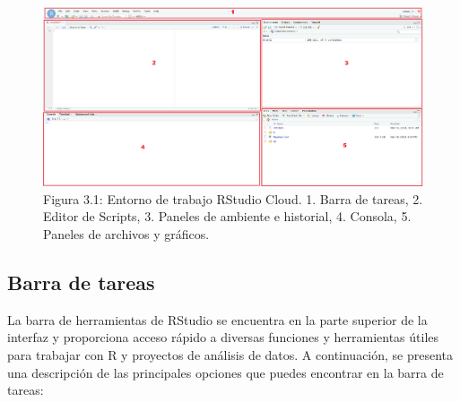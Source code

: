 \documentclass[
]{article}
\begin{document}
\begin{figure}

{\centering \includegraphics[width=2000px]{images/entorno_num} 

}

\caption{Figura 3.1: Entorno de trabajo RStudio Cloud.  
1. Barra de tareas, 2. Editor de Scripts, 3. Paneles de ambiente e historial, 4. Consola, 5. Paneles de archivos y gráficos.}\label{fig:entorno}
\end{figure}

\subsection{Barra de tareas}\label{barra-de-tareas}

La barra de herramientas de RStudio se encuentra en la parte superior de
la interfaz y proporciona acceso rápido a diversas funciones y
herramientas útiles para trabajar con R y proyectos de análisis de
datos. A continuación, se presenta una descripción de las principales
opciones que puedes encontrar en la barra de tareas:
\end{document}
